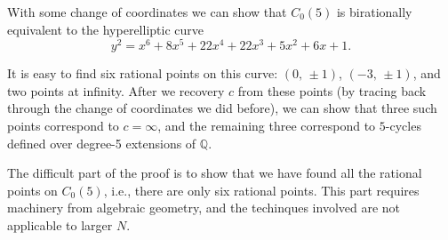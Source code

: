 \documentclass{amsart}
\theoremstyle{plain}
\theoremstyle{definition}
\theoremstyle{remark}
\newcommand{\Q}{\mathbb{Q}}
\begin{document}
With some change of coordinates we can show that $C_0(5)$ is
birationally equivalent to the hyperelliptic curve
\[
y^2 = x^6 + 8x^5 + 22x^4 + 22x^3 + 5x^2 + 6x + 1.
\]

It is easy to find six rational points on this curve: $(0,\, \pm 1)$,
$(-3,\, \pm 1)$, and two points at infinity. After we recovery $c$
from these points (by tracing back through the change of coordinates
we did before), we can show that three such points correspond to $c =
\infty$, and the remaining three correspond to $5$-cycles defined over
degree-5 extensions of $\Q$.

The difficult part of the proof is to show that we have found all the
rational points on $C_0(5)$, i.e., there are only six rational
points. This part requires machinery from algebraic geometry, and the
techinques involved are not applicable to larger $N$.
\end{document}
